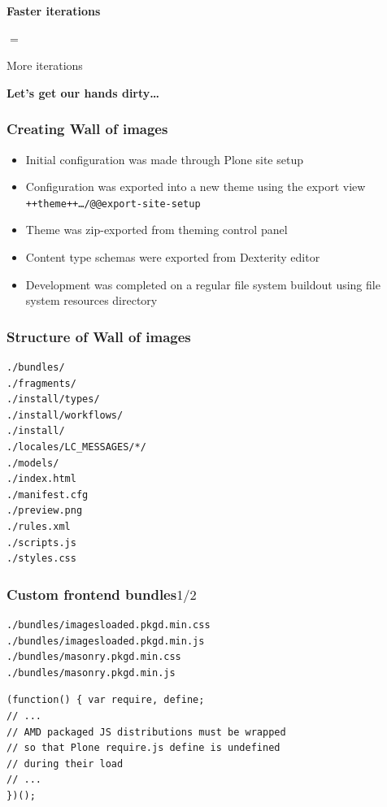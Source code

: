 \documentclass[aspectratio=43]{beamer}
\begin{document}
\begin{frame}[plain,t]
  \vspace{8em}
  \huge
  \bfseries
  \centering
  Faster iterations
  \par
  $=$
  \par
  More iterations
\end{frame}

\begin{frame}[plain,c]
  \huge
  \bfseries
  \centering
  \vspace{1cm}
  Let's get our hands dirty\dots
\end{frame}

\begin{frame}[plain,t]
  \frametitle{Creating Wall of images}
  \begin{itemize}[<+->]
  \setlength{\itemsep}{1em}
  \item Initial configuration was made through Plone site setup
  \item Configuration was exported into a new theme using the export view
  \texttt{++theme++\ldots/@@export-site-setup}
  \item Theme was zip-exported from theming control panel
  \item Content type schemas were exported from Dexterity editor
  \item Development was completed on a regular file system buildout
  using file system resources directory
  \end{itemize}
\end{frame}

\begin{frame}
  \frametitle{Structure of Wall of images}
  \begin{verbatim}
./bundles/
./fragments/
./install/types/
./install/workflows/
./install/
./locales/LC_MESSAGES/*/
./models/
./index.html
./manifest.cfg
./preview.png
./rules.xml
./scripts.js
./styles.css
  \end{verbatim}
\end{frame}

\begin{frame}
\frametitle{Custom frontend bundles\hfill$1/2$}
\begin{verbatim}
./bundles/imagesloaded.pkgd.min.css
./bundles/imagesloaded.pkgd.min.js
./bundles/masonry.pkgd.min.css
./bundles/masonry.pkgd.min.js
\end{verbatim}
\vspace{\lineheight}
\begin{verbatim}
(function() { var require, define;
// ...
// AMD packaged JS distributions must be wrapped
// so that Plone require.js define is undefined
// during their load
// ...
})();
\end{verbatim}
\end{frame}
\end{document}
